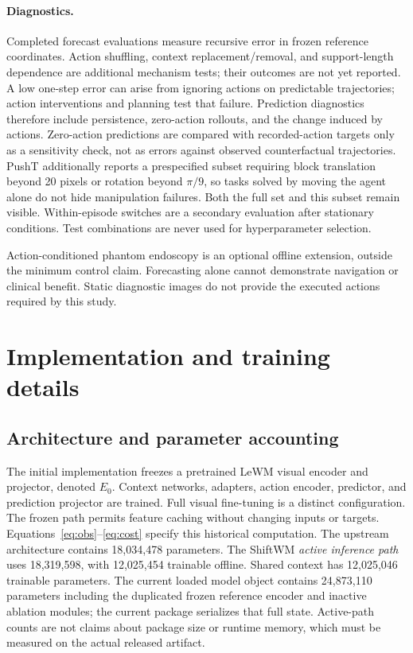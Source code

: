 \paragraph{Diagnostics.}
Completed forecast evaluations measure recursive error in frozen reference
coordinates. Action shuffling, context replacement/removal, and support-length
dependence are additional mechanism tests; their outcomes are not yet reported.
A low one-step error can arise from ignoring actions on predictable
trajectories; action interventions and planning test that failure.
Prediction diagnostics therefore include persistence, zero-action rollouts,
and the change induced by actions. Zero-action predictions are compared
with recorded-action targets only as a sensitivity check, not as errors
against observed counterfactual trajectories. PushT additionally reports a prespecified
subset requiring block translation beyond 20 pixels or rotation beyond
$\pi/9$, so tasks solved by moving the agent alone do not hide manipulation
failures. Both the full set and this subset remain visible.
Within-episode switches are a secondary evaluation after stationary
conditions. Test combinations are never used for hyperparameter selection.

Action-conditioned phantom endoscopy is an optional offline extension, outside
the minimum control claim. Forecasting alone cannot demonstrate navigation or
clinical benefit. Static diagnostic images do not provide the executed actions
required by this study.

\FloatBarrier
\section{Implementation and training details}
\label{sec:implementation}
\subsection{Architecture and parameter accounting}
The initial implementation freezes a pretrained LeWM visual encoder and
projector, denoted $E_0$. Context networks, adapters, action encoder,
predictor, and prediction projector are trained. Full visual fine-tuning is
a distinct configuration. The frozen path permits feature caching without
changing inputs or targets. Equations~\ref{eq:obs}--\ref{eq:cost} specify this
historical computation.
The upstream architecture contains 18,034,478 parameters. The ShiftWM
\emph{active inference path} uses 18,319,598, with 12,025,454 trainable
offline. Shared context has 12,025,046 trainable parameters.
The current loaded model object contains 24,873,110 parameters including
the duplicated frozen reference encoder and inactive ablation modules;
the current package serializes that full state. Active-path counts are
not claims about package size or runtime memory, which must be measured
on the actual released artifact.

